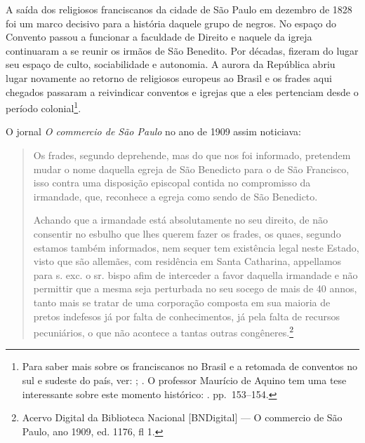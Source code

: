 \begin{refsection}
    A saída dos religiosos franciscanos da cidade de São Paulo em dezembro de 1828 foi um marco decisivo para a história daquele grupo de negros. No espaço do Convento passou a funcionar a faculdade de Direito e naquele da igreja continuaram a se reunir os irmãos de São Benedito. Por décadas, fizeram do lugar seu espaço de culto, sociabilidade e autonomia. A aurora da República abriu lugar novamente ao retorno de religiosos europeus ao Brasil e os frades aqui chegados passaram a reivindicar conventos e igrejas que a eles pertenciam desde o período colonial\footnote{Para saber mais sobre os franciscanos no Brasil e a retomada de conventos no sul e sudeste do país, ver: ; . O professor Maurício de Aquino tem uma tese interessante sobre este momento histórico: . pp.~153--154.}.
    
    O jornal \textit{O commercio de São Paulo} no ano de 1909 assim noticiava:

    \begin{quotation}
        Os frades, segundo deprehende, mas do que nos foi informado, pretendem mudar o nome daquella egreja de São Benedicto para o de São Francisco, isso contra uma disposição episcopal contida no compromisso da irmandade, que, reconhece a egreja como sendo de São Benedicto.

        Achando que a irmandade está absolutamente no seu direito, de não consentir no esbulho que lhes querem fazer os frades, os quaes, segundo estamos também informados, nem sequer tem existência legal neste Estado, visto que são allemães, com residência em Santa Catharina, appellamos para s. exc. o sr. bispo afim de interceder a favor daquella irmandade e não permittir que a mesma seja perturbada no seu socego de mais de 40 annos, tanto mais se tratar de uma corporação composta em sua maioria de pretos indefesos já por falta de conhecimentos, já pela falta de recursos pecuniários, o que não acontece a tantas outras congêneres.\footnote{Acervo Digital da Biblioteca Nacional [BNDigital] --- O commercio de São Paulo, ano 1909, ed. 1176, fl 1.}
    \end{quotation}



\end{refsection}
